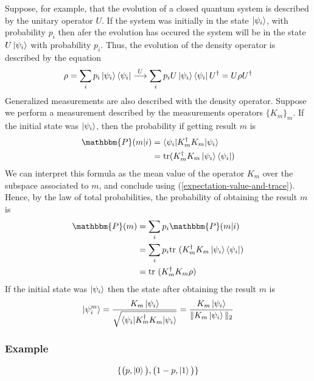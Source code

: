 \documentclass{article}
\begin{document}
Suppose, for example, that the evolution of a closed quantum system is described by the unitary
operator $U$. If the system was initially in the state $\ket{\psi_i}$, with probability $p_i$
then afer the evolution has occured the system will be in the state $U\ket{\psi_i}$ with probability
$p_i$. Thus, the evolution of the density operator is described by the equation
\begin{equation}
    \rho=\sum_ip_i\ket{\psi_i}\bra{\psi_i} \overset{U}{\longrightarrow}
        \sum_ip_iU\ket{\psi_i}\bra{\psi_i}U^\dagger=U\rho U^\dagger
\end{equation}
Generalized measurements are also described with the density operator.
Suppose we perform a measurement described by the measurements operators
$\{K_m\}_m$. If the initial state was $\ket{\psi_i}$, then the probability if getting
result $m$ is
\begin{equation}
    \begin{aligned}
        \mathbbm{P}(m|i)
            & = \braket{\psi_i|K_m^\dagger K_m |\psi_i} \\
            & = \text{tr}(K_m^\dagger K_m\ket{\psi_i}\bra{\psi_i})
    \end{aligned}
\end{equation}
We can interpret this formula as the mean value of the operator $K_m$ over the subspace
associated to $m$, and conclude using (\ref{expectation-value-and-trace}).\\\noindent
Hence, by the law of total probabilities, the probability of obtaining the result $m$ is
\begin{equation}
    \begin{aligned}
        \mathbbm{P}(m)
            & = \sum_i p_i \mathbbm{P}(m|i) \\
            & = \sum_i p_i \text{tr }(K_m^\dagger K_m\ket{\psi_i}\bra{\psi_i}) \\
            & = \text{tr }(K_m^\dagger K_m \rho)
    \end{aligned}
\end{equation}
If the initial state was $\ket{\psi_i}$ then the state after obtaining the result $m$ is
\begin{equation}
    \ket{\psi_i^m}
        = \frac{K_m\ket{\psi_i}}{\sqrt{\braket{\psi_i|K_m^\dagger K_m|\psi_i}}}
        = \frac{K_m\ket{\psi_i}}{\|K_m\ket{\psi_i}\|_2}
\end{equation}

\subsubsection*{Example}
\begin{equation}
    \{\big(p, \ket{0}\big), \big(1-p, \ket{1}\big)\}
\end{equation}
\end{document}
